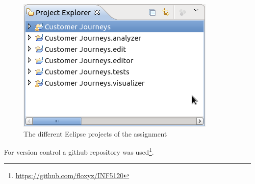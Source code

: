 \documentclass[12pt]{scrartcl}
\begin{document}
\begin{figure}[hbtp]
	\centering
	\includegraphics[scale=0.7]{img/projectexplorer.png}
	\caption{The different Eclipse projects of the assignment}
	\label{figure:projects}
\end{figure}

For version control a github repository was used\footnote{\url{https://github.com/floxyz/INF5120}}.
\end{document}
